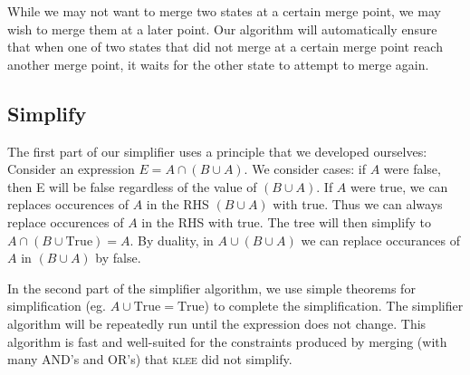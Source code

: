 \documentclass[12pt,a4paper]{article}
\newcommand{\klee}{\textsc{klee }}
\begin{document}
While we may not want to merge two states at a certain merge point, we may wish to merge them at a later point. Our algorithm will automatically ensure that when one of two states that did not merge at a certain merge point reach another merge point, it waits for the other state to attempt to merge again.

\subsection*{Simplify}
The first part of our simplifier uses a principle that we developed ourselves:
Consider an expression $E = A\cap(B\cup A)$. We consider cases: if $A$ were false, then E will be false regardless of the value of $(B\cup A)$. If $A$ were true, we can replaces occurences of $A$ in the RHS $(B\cup A)$ with true. Thus we can always replace occurences of $A$ in the RHS with true. The tree will then simplify to $A\cap(B\cup \text{True}) = A$. By duality, in $A\cup(B\cup A)$ we can replace occurances of $A$ in $(B\cup A)$ by false.

In the second part of the simplifier algorithm, we use simple theorems for simplification (eg. $A\cup \text{True} = \text{True}$) to complete the simplification. The simplifier algorithm will be repeatedly run until the expression does not change. This algorithm is fast and well-suited for the constraints produced by merging (with many AND's and OR's) that \klee did not simplify.
\end{document}
